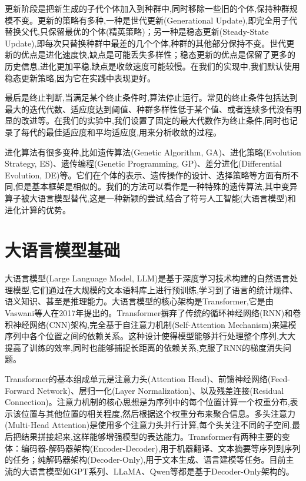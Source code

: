 更新阶段是把新生成的子代个体加入到种群中,同时移除一些旧的个体,保持种群规模不变。更新的策略有多种,一种是世代更新(Generational Update),即完全用子代替换父代,只保留最优的个体(精英策略)；另一种是稳态更新(Steady-State Update),即每次只替换种群中最差的几个个体,种群的其他部分保持不变。世代更新的优点是进化速度快,缺点是可能丢失多样性；稳态更新的优点是保留了更多的历史信息,进化更加平稳,缺点是收敛速度可能较慢。在我们的实现中,我们默认使用稳态更新策略,因为它在实践中表现更好。

最后是终止判断,当满足某个终止条件时,算法停止运行。常见的终止条件包括达到最大的迭代代数、适应度达到阈值、种群多样性低于某个值、或者连续多代没有明显的改进等。在我们的实验中,我们设置了固定的最大代数作为终止条件,同时也记录了每代的最佳适应度和平均适应度,用来分析收敛的过程。

进化算法有很多变种,比如遗传算法(Genetic Algorithm, GA)、进化策略(Evolution Strategy, ES)、遗传编程(Genetic Programming, GP)、差分进化(Differential Evolution, DE)等。它们在个体的表示、遗传操作的设计、选择策略等方面有所不同,但是基本框架是相似的。我们的方法可以看作是一种特殊的遗传算法,其中变异算子被大语言模型替代,这是一种新颖的尝试,结合了符号人工智能(大语言模型)和进化计算的优势。

\section{大语言模型基础}

大语言模型(Large Language Model, LLM)是基于深度学习技术构建的自然语言处理模型,它们通过在大规模的文本语料库上进行预训练,学习到了语言的统计规律、语义知识、甚至是推理能力。大语言模型的核心架构是Transformer,它是由Vaswani等人在2017年提出的\cite{vaswani2017attention}。Transformer摒弃了传统的循环神经网络(RNN)和卷积神经网络(CNN)架构,完全基于自注意力机制(Self-Attention Mechanism)来建模序列中各个位置之间的依赖关系。这种设计使得模型能够并行处理整个序列,大大提高了训练的效率,同时也能够捕捉长距离的依赖关系,克服了RNN的梯度消失问题。

Transformer的基本组成单元是注意力头(Attention Head)、前馈神经网络(Feed-Forward Network)、层归一化(Layer Normalization)、以及残差连接(Residual Connection)。注意力机制的核心思想是为序列中的每个位置计算一个权重分布,表示该位置与其他位置的相关程度,然后根据这个权重分布来聚合信息。多头注意力(Multi-Head Attention)是使用多个注意力头并行计算,每个头关注不同的子空间,最后把结果拼接起来,这样能够增强模型的表达能力。Transformer有两种主要的变体：编码器-解码器架构(Encoder-Decoder),用于机器翻译、文本摘要等序列到序列的任务；纯解码器架构(Decoder-Only),用于文本生成、语言建模等任务。目前主流的大语言模型如GPT系列、LLaMA、Qwen等都是基于Decoder-Only架构的。

